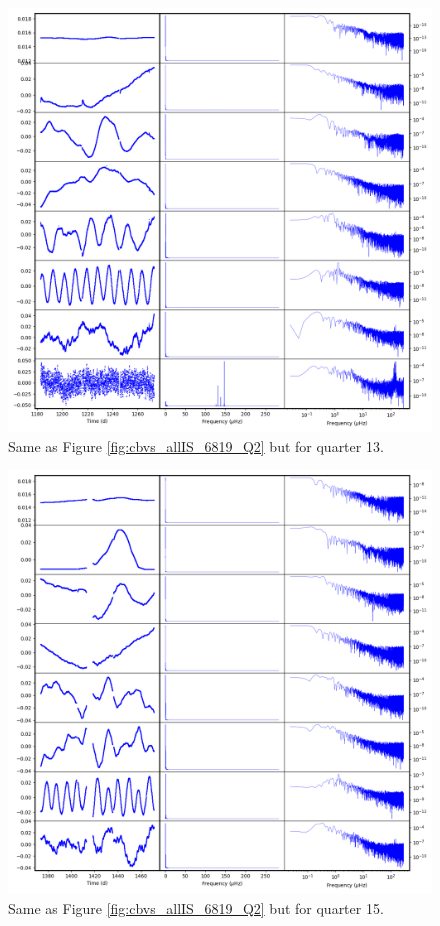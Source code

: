 \begin{figure}
    \centering
    \includegraphics[width=\linewidth]{Chapter_Appended/AppB/cbv_6819_q13.png}
    \caption{Same as Figure \ref{fig:cbvs_allIS_6819_Q2} but for quarter 13.}
    \label{fig:cbvs_allIS_6819_Q13}
\end{figure}


\begin{figure}
    \centering
    \includegraphics[width=\linewidth]{Chapter_Appended/AppB/cbv_6819_q15.png}
    \caption{Same as Figure \ref{fig:cbvs_allIS_6819_Q2} but for quarter 15.}
    \label{fig:cbvs_allIS_6819_Q15}
\end{figure}


